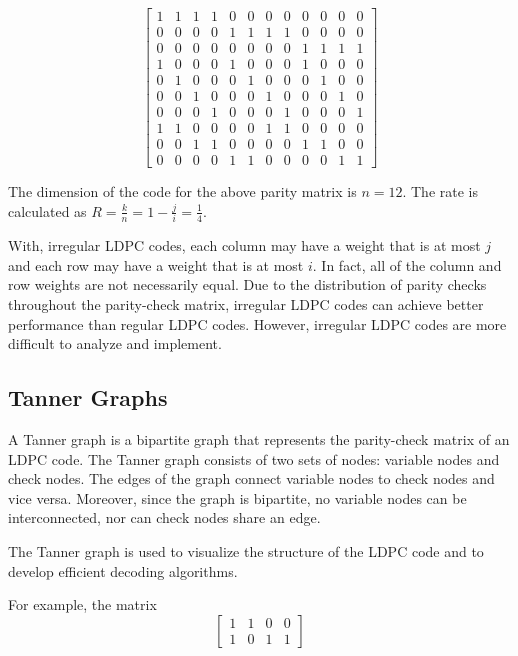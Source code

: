 \documentclass[conference]{IEEEtran}
\begin{document}
$$\begin{bmatrix}
    1 & 1 & 1 & 1 & 0 & 0 & 0 & 0 & 0 & 0 & 0 & 0 \\
    0 & 0 & 0 & 0 & 1 & 1 & 1 & 1 & 0 & 0 & 0 & 0 \\
    0 & 0 & 0 & 0 & 0 & 0 & 0 & 0 & 1 & 1 & 1 & 1 \\
    1 & 0 & 0 & 0 & 1 & 0 & 0 & 0 & 1 & 0 & 0 & 0 \\
    0 & 1 & 0 & 0 & 0 & 1 & 0 & 0 & 0 & 1 & 0 & 0 \\
    0 & 0 & 1 & 0 & 0 & 0 & 1 & 0 & 0 & 0 & 1 & 0 \\
    0 & 0 & 0 & 1 & 0 & 0 & 0 & 1 & 0 & 0 & 0 & 1 \\
    1 & 1 & 0 & 0 & 0 & 0 & 1 & 1 & 0 & 0 & 0 & 0 \\
    0 & 0 & 1 & 1 & 0 & 0 & 0 & 0 & 1 & 1 & 0 & 0 \\
    0 & 0 & 0 & 0 & 1 & 1 & 0 & 0 & 0 & 0 & 1 & 1
  \end{bmatrix}$$

  The dimension of the code for the above parity matrix is $n=12$.
  The rate is calculated as $R=\frac{k}{n}=1-\frac{j}{i}=\frac{1}{4}$.

With, irregular LDPC codes, each column may have a weight that is at most $j$ and each row may have a weight that is at most $i$.
In fact, all of the column and row weights are not necessarily equal.
Due to the distribution of parity checks throughout the parity-check matrix, irregular LDPC codes can achieve better performance than regular LDPC codes.
However, irregular LDPC codes are more difficult to analyze and implement.

\subsection{Tanner Graphs}
A Tanner graph is a bipartite graph that represents the parity-check matrix of
an LDPC code. The Tanner graph consists of two sets of nodes: variable nodes
and check nodes. The edges of the graph connect variable nodes to check nodes
and vice versa.
Moreover, since the graph is bipartite, no variable nodes can be interconnected, nor can check nodes share an edge.

The Tanner graph is used to visualize the structure of the LDPC code and to
develop efficient decoding algorithms.

For example, the matrix
\[
  \begin{bmatrix}
    1 & 1 & 0 & 0 \\
    1 & 0 & 1 & 1
  \end{bmatrix}
\]
\end{document}
